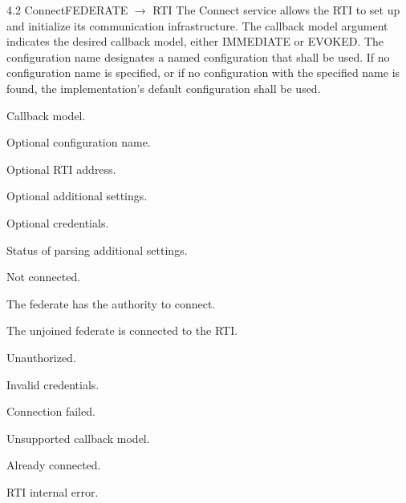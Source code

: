 \documentclass[10pt,oneside]{article}
\newcommand{\AcceptanceType}[1]{{\RLMono\fontsize{8.1pt}{9.8pt}\selectfont\color{RLBlueDeep}\mbox{#1}}}
\begin{document}
\clearpage
\thispagestyle{RLHLA}
\begin{HLAServiceContract}{4.2 Connect}{FEDERATE $\rightarrow$ RTI}
The \AcceptanceType{Connect} service allows the RTI to set up and initialize
its communication infrastructure. The callback model argument indicates the
desired callback model, either \AcceptanceType{IMMEDIATE} or
\AcceptanceType{EVOKED}. The configuration name designates a named
configuration that shall be used. If no configuration name is specified, or if
no configuration with the specified name is found, the implementation's
default configuration shall be used.
\begin{HLAServiceContractList}
    \item Callback model.
    \item Optional configuration name.
    \item Optional RTI address.
    \item Optional additional settings.
    \item Optional credentials.
\end{HLAServiceContractList}
\begin{HLAServiceContractList}
    \item Status of parsing additional settings.
\end{HLAServiceContractList}
\begin{HLAServiceContractList}
    \item Not connected.
    \item The federate has the authority to connect.
\end{HLAServiceContractList}
\begin{HLAServiceContractList}
    \item The unjoined federate is connected to the RTI.
\end{HLAServiceContractList}
\begin{HLAServiceContractList}
    \item Unauthorized.
    \item Invalid credentials.
    \item Connection failed.
    \item Unsupported callback model.
    \item Already connected.
    \item RTI internal error.
\end{HLAServiceContractList}
\end{HLAServiceContract}
\end{document}
